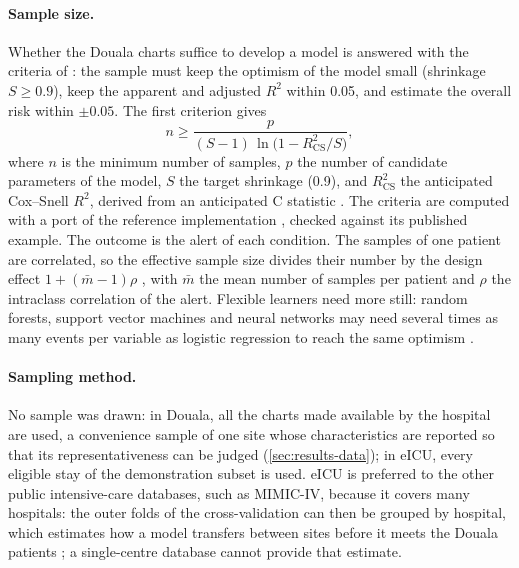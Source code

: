 \paragraph{Sample size.} Whether the Douala charts suffice to develop a model is answered with the criteria of \textcite{riley2019partII,riley2020bmj}: the sample must keep the optimism of the model small (shrinkage $S \geq 0.9$), keep the apparent and adjusted $R^2$ within 0.05, and estimate the overall risk within $\pm 0.05$. The first criterion gives
\begin{equation}
  n \geq \frac{p}{(S - 1)\,\ln\bigl(1 - R^2_{\mathrm{CS}}/S\bigr)} ,
\end{equation}
where $n$ is the minimum number of samples, $p$ the number of candidate parameters of the model, $S$ the target shrinkage (0.9), and $R^2_{\mathrm{CS}}$ the anticipated Cox--Snell $R^2$, derived from an anticipated C statistic \parencite{riley2021cstat}. The criteria are computed with a port of the reference implementation \parencite{pmsampsize}, checked against its published example. The outcome is the alert of each condition. The samples of one patient are correlated, so the effective sample size divides their number by the design effect $1 + (\bar m - 1)\rho$ \parencite{kish1965}, with $\bar m$ the mean number of samples per patient and $\rho$ the intraclass correlation of the alert. Flexible learners need more still: random forests, support vector machines and neural networks may need several times as many events per variable as logistic regression to reach the same optimism \parencite{vanderploeg2014}.

\paragraph{Sampling method.} No sample was drawn: in Douala, all the charts made available by the hospital are used, a convenience sample of one site whose characteristics are reported so that its representativeness can be judged (\cref{sec:results-data}); in eICU, every eligible stay of the demonstration subset is used. eICU is preferred to the other public intensive-care databases, such as MIMIC-IV, because it covers many hospitals: the outer folds of the cross-validation can then be grouped by hospital, which estimates how a model transfers between sites before it meets the Douala patients \parencite{steyerberg2016}; a single-centre database cannot provide that estimate.

